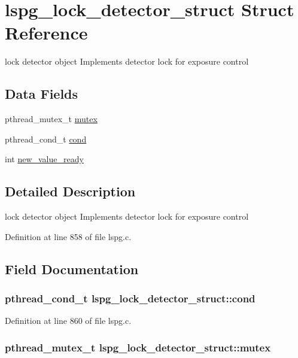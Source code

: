 \hypertarget{structlspg__lock__detector__struct}{
\section{lspg\_\-lock\_\-detector\_\-struct Struct Reference}
\label{structlspg__lock__detector__struct}
}


lock detector object Implements detector lock for exposure control  
\subsection*{Data Fields}
\begin{DoxyCompactItemize}
\item 
pthread\_\-mutex\_\-t \hyperlink{structlspg__lock__detector__struct_ab5ab5534b376a8fbafdd0b54cec4483c}{mutex}
\item 
pthread\_\-cond\_\-t \hyperlink{structlspg__lock__detector__struct_adc90c859665dccc8717219e824cba0b8}{cond}
\item 
int \hyperlink{structlspg__lock__detector__struct_a62373414b815fe178edd8522b3bd4d78}{new\_\-value\_\-ready}
\end{DoxyCompactItemize}


\subsection{Detailed Description}
lock detector object Implements detector lock for exposure control 

Definition at line 858 of file lspg.c.

\subsection{Field Documentation}
\hypertarget{structlspg__lock__detector__struct_adc90c859665dccc8717219e824cba0b8}{
\subsubsection[{cond}]{\setlength{\rightskip}{0pt plus 5cm}pthread\_\-cond\_\-t {\bf lspg\_\-lock\_\-detector\_\-struct::cond}}}
\label{structlspg__lock__detector__struct_adc90c859665dccc8717219e824cba0b8}


Definition at line 860 of file lspg.c.\hypertarget{structlspg__lock__detector__struct_ab5ab5534b376a8fbafdd0b54cec4483c}{
\subsubsection[{mutex}]{\setlength{\rightskip}{0pt plus 5cm}pthread\_\-mutex\_\-t {\bf lspg\_\-lock\_\-detector\_\-struct::mutex}}}
\label{structlspg__lock__detector__struct_ab5ab5534b376a8fbafdd0b54cec4483c}


